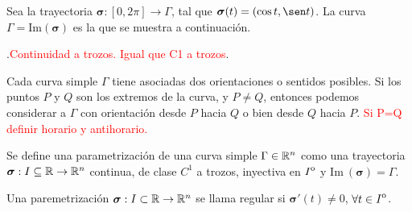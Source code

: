 \begin{example}
    Sea la trayectoria $\boldsymbol{\sigma}:[0,2\pi]\to\Gamma$, tal que $\boldsymbol{\sigma}(t)=(\cos t, \sen t)$. La curva $\Gamma=\text{Im}(\boldsymbol{\sigma})$ es la que se muestra a continuaci\'on.

    \begin{center}
    \end{center}
    
\end{example}

\begin{definition}
    .\textcolor{red}{Continuidad a trozos. Igual que C1 a trozos}.\final
\end{definition}

Cada curva simple $\Gamma$ tiene asociadas dos orientaciones o sentidos posibles. Si los puntos $P$ y $Q$ son los extremos de la curva, y $P\neq Q$, entonces podemos considerar a $\Gamma$ con orientaci\'on desde $P$ hacia $Q$ o bien desde $Q$ hacia $P$. \textcolor{red}{Si P=Q definir horario y antihorario.}

\begin{definition}
    Se define una parametrizaci\'on de una curva simple $\Gamma\in\mathbb{R}^n$ como una trayectoria $\boldsymbol{\sigma}:I\subseteq\mathbb{R}\to\mathbb{R}^n$ continua, de clase $C^1$ a trozos, inyectiva en ${\kern0ptI}^{\mathrm{o}}$ y $\text{Im}\:(\boldsymbol{\sigma})=\Gamma$.\final
\end{definition}

\begin{definition}
    Una paremetrizaci\'on $\boldsymbol{\sigma}:I\subset\mathbb{R}\to\mathbb{R}^n$ se llama regular si $\boldsymbol{\sigma}'(t)\neq0$, $\forall t\in{\kern0ptI}^{\mathrm{o}}$.\final
\end{definition}
